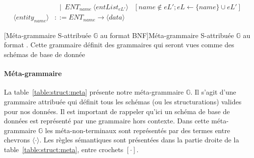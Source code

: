 \begin{landscape}
\begin{adjustbox}{max width=\linewidth,max height=.95\textheight,valign=c}
{\begin{align}
                                                            & ~~ \mid ~ ENT_{name} ~ \langle entList_{eL'} \rangle                                                                                                                                                                                                                                                                                                                                         & [name \notin eL'; eL \gets \{name\} \cup eL']                                                                     \label{meta:entList:2}  \\
                \langle entity_{name} \rangle               & ::= ENT_{name} \to \langle data \rangle \label{meta:entity}
            \end{align}}
    \end{adjustbox}
    [Méta-grammaire S-attribuée $\mathbb{G}$ au format BNF]{Méta-grammaire S-attribuée $\mathbb{G}$ au format . Cette grammaire définit des grammaires qui seront vues comme des schémas de base de donnée \label{table:struct:meta}}
\end{landscape}

\paragraph{Méta-grammaire}
La table~\ref{table:struct:meta} présente notre méta-grammaire $\mathbb{G}$.
Il s'agit d'une grammaire attribuée qui définit tous les schémas (ou les structurations) valides pour nos données.
Il est important de rappeler qu'ici un schéma de base de données est représenté par une grammaire hors contexte.
Dans cette méta-grammaire $\mathbb{G}$ les méta-non-terminaux sont représentés par des termes entre chevrons $\langle \cdot \rangle$.
Les règles sémantiques sont présentées dans la partie droite de la table~\ref{table:struct:meta}, entre crochets $[ \cdot ]$.

